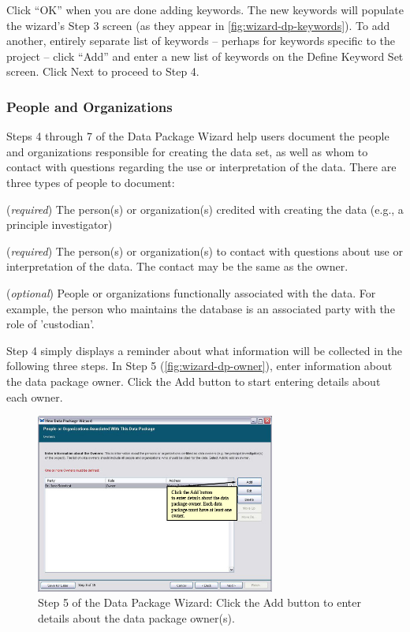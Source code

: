 Click ``OK'' when you are done adding keywords. The new keywords will
populate the wizard's Step 3 screen (as they appear in
\autoref{fig:wizard-dp-keywords}). To add another, entirely separate
list of keywords -- perhaps for keywords specific to the project --
click ``Add'' and enter a new list of keywords on the Define Keyword Set
screen. Click Next to proceed to Step 4.

\subsubsection{People and Organizations} \label{sec:wizard-dp-people}

Steps 4 through 7 of the Data Package Wizard help users document the
people and organizations responsible for creating the data set, as well
as whom to contact with questions regarding the use or interpretation of
the data. There are three types of people to document:
\begin{description}
  \setlength{\parskip}{1pt}
  \item [Owner] (\emph{required}) The person(s) or organization(s) credited with
    creating the data (e.g., a principle investigator)
  \item [Contact] (\emph{required}) The person(s) or organization(s) to contact
    with questions about use or interpretation of the data. The contact
    may be the same as the owner.
  \item [Associated parties] (\emph{optional}) People or organizations
    functionally associated with the data. For example, the person who
    maintains the database is an associated party with the role of
    'custodian'.
\end{description}

Step 4 simply displays a reminder about what information will be
collected in the following three steps. In Step 5
(\autoref{fig:wizard-dp-owner}), enter information about the data
package owner. Click the Add button to start entering details about each
owner.

\begin{figure}
  \centering
    \includegraphics[width=0.7\textwidth]{images/wizard-dp-owner.jpg}
  \caption{Step 5 of the Data Package Wizard: Click the Add button to
    enter details about the data package owner(s).}
  \label{fig:wizard-dp-owner}
\end{figure}

